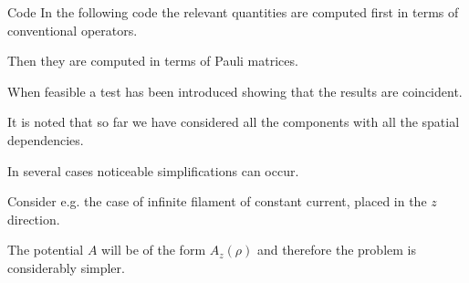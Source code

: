 \documentclass[handout,10pt]{beamer}
\begin{document}
\begin{frame}[shrink=00]{Code}
In the following code the relevant quantities are computed first in terms of conventional operators. 

Then they are computed in terms of Pauli matrices.

When feasible a test has been introduced showing that the results are coincident.

%
%
It is noted that so far we have considered all the components with all the spatial dependencies. 

In several cases noticeable simplifications can occur. 

Consider e.g. the case of infinite filament of constant current, placed in the $z$ direction. 

The potential $A$ will be of the form $A_z(\rho)$ and therefore the problem is considerably simpler.



\end{frame}
\begin{frame}[shrink=00]{}
\clearpage
\small

\normalsize
\end{frame}


\end{document}
